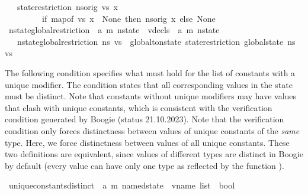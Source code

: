 \begin{isabellebody}
\ \ \ {\isachardoublequoteopen}state{\isacharunderscore}{\kern0pt}restriction\ ns{\isacharunderscore}{\kern0pt}orig\ vs\ x\ {\isacharequal}{\kern0pt}\ \isanewline
\ \ \ \ \ \ \ \ \ {\isacharparenleft}{\kern0pt}if\ map{\isacharunderscore}{\kern0pt}of\ vs\ x\ {\isasymnoteq}\ None\ then\ ns{\isacharunderscore}{\kern0pt}orig\ x\ else\ None{\isacharparenright}{\kern0pt}{\isachardoublequoteclose}\isanewline
\isanewline
{}\isamarkupfalse%
\ nstate{\isacharunderscore}{\kern0pt}global{\isacharunderscore}{\kern0pt}restriction\ {\isacharcolon}{\kern0pt}{\isacharcolon}{\kern0pt}\ {\isachardoublequoteopen}{\isacharparenleft}{\kern0pt}{\isacharprime}{\kern0pt}a{\isacharcomma}{\kern0pt}\ {\isacharprime}{\kern0pt}m{\isacharparenright}{\kern0pt}\ nstate\ {\isasymRightarrow}\ vdecls\ {\isasymRightarrow}\ {\isacharparenleft}{\kern0pt}{\isacharprime}{\kern0pt}a{\isacharcomma}{\kern0pt}\ {\isacharprime}{\kern0pt}m{\isacharparenright}{\kern0pt}\ nstate{\isachardoublequoteclose}\isanewline
\ \ \ {\isachardoublequoteopen}nstate{\isacharunderscore}{\kern0pt}global{\isacharunderscore}{\kern0pt}restriction\ ns\ vs\ {\isacharequal}{\kern0pt}\ global{\isacharunderscore}{\kern0pt}to{\isacharunderscore}{\kern0pt}nstate\ {\isacharparenleft}{\kern0pt}state{\isacharunderscore}{\kern0pt}restriction\ {\isacharparenleft}{\kern0pt}global{\isacharunderscore}{\kern0pt}state\ ns{\isacharparenright}{\kern0pt}\ vs{\isacharparenright}{\kern0pt}{\isachardoublequoteclose}%
\begin{isamarkuptext}%
The following condition specifies what must hold for the list of constants with a unique modifier.
      The condition states that all corresponding values in the state must be distinct. Note that constants
      without unique modifiers may have values that clash with unique constants, which is consistent with the 
      verification condition generated by Boogie (status 21.10.2023).
      Note that the verification condition only forces distinctness between values of unique constants of 
      the \emph{same} type. Here, we force distinctness between values of all unique constants. These two
      definitions are equivalent, since values of different types are distinct in Boogie by default
      (every value can have only one type as reflected by the function ).%
\end{isamarkuptext}\isamarkuptrue%
\isamarkupfalse%
\ unique{\isacharunderscore}{\kern0pt}constants{\isacharunderscore}{\kern0pt}distinct\ {\isacharcolon}{\kern0pt}{\isacharcolon}{\kern0pt}\ {\isachardoublequoteopen}{\isacharparenleft}{\kern0pt}{\isacharprime}{\kern0pt}a{\isacharcomma}{\kern0pt}\ {\isacharprime}{\kern0pt}m{\isacharparenright}{\kern0pt}\ named{\isacharunderscore}{\kern0pt}state\ {\isasymRightarrow}\ vname\ list\ {\isasymRightarrow}\ bool{\isachardoublequoteclose}\isanewline

\end{isabellebody}
